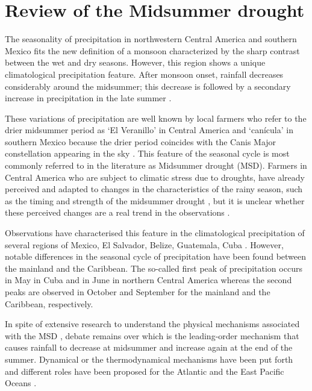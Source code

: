 \section{Review of the Midsummer drought}\label{sq:lit}


The seasonality of precipitation in northwestern Central America and southern Mexico fits the new definition of a monsoon characterized by the sharp contrast between the wet and dry seasons.
However, this region shows a unique climatological precipitation feature. After monsoon onset, rainfall decreases considerably around the midsummer; this decrease is followed by a secondary increase in precipitation in the late summer \citep{mosino1966}. 


These variations of precipitation are well known by local farmers who refer to the drier midsummer period as `El Veranillo' in Central America and `can\' icula' in southern Mexico because the drier period  coincides with the Canis Major constellation appearing in the sky \citep{dilley1996}. This feature of the seasonal cycle is most commonly referred to in the literature as Midsummer drought (MSD). 
Farmers in Central America who are subject to climatic stress due to droughts, have already perceived and adapted to changes in the characteristics of the rainy season, such as the timing and strength of the midsummer drought \citep{hellin2017,de2018,harvey2018}, but it is unclear whether these perceived changes are a real trend in the observations \citep{anderson2019multiscale}. 


Observations have characterised this feature in the climatological precipitation of several regions of Mexico, El Salvador, Belize, Guatemala, Cuba \citep[e.g.][]{mosino1966,magana1999,duranquesada2017,perdigon2018}.
However, notable differences in the seasonal cycle of precipitation have been found between the mainland and the Caribbean. The so-called first peak of precipitation occurs in May in Cuba and in June in northern Central America whereas the second peaks are observed in October and September for the mainland and the Caribbean, respectively. 

 In spite of extensive research to understand the physical mechanisms associated with the MSD   \citep[e.g.][]{magana1999,giannini2000,gamble2008,ryu2014,herrera2015,maldonado2017,straffon2019}, debate remains over which is the leading-order mechanism that causes rainfall to decrease at midsummer and increase again at the end of the summer.  %
Dynamical or the thermodynamical mechanisms have been put forth and different roles have been proposed for the Atlantic and the East Pacific Oceans \citep[e.g.][]{magana2005,gamble2008,herrera2015}. 

